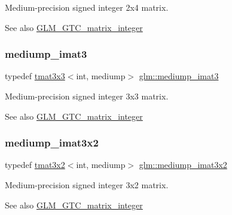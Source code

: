 Medium-\/precision signed integer 2x4 matrix. \begin{DoxySeeAlso}{See also}
\hyperlink{group__gtc__matrix__integer}{G\+L\+M\+\_\+\+G\+T\+C\+\_\+matrix\+\_\+integer} 
\end{DoxySeeAlso}
\mbox{\label{group__gtc__matrix__integer_gab033bd6a2bfebb1aa35d458c6f077ccb}} 
\subsubsection{\texorpdfstring{mediump\+\_\+imat3}{mediump\_imat3}}
{\footnotesize\ttfamily typedef \hyperlink{structglm_1_1tmat3x3}{tmat3x3}$<$int, mediump$>$ \hyperlink{group__gtc__matrix__integer_gab033bd6a2bfebb1aa35d458c6f077ccb}{glm\+::mediump\+\_\+imat3}}

Medium-\/precision signed integer 3x3 matrix. \begin{DoxySeeAlso}{See also}
\hyperlink{group__gtc__matrix__integer}{G\+L\+M\+\_\+\+G\+T\+C\+\_\+matrix\+\_\+integer} 
\end{DoxySeeAlso}
\mbox{\label{group__gtc__matrix__integer_ga8f682b5b64e2072c0729409ee6bfe2af}} 
\subsubsection{\texorpdfstring{mediump\+\_\+imat3x2}{mediump\_imat3x2}}
{\footnotesize\ttfamily typedef \hyperlink{structglm_1_1tmat3x2}{tmat3x2}$<$int, mediump$>$ \hyperlink{group__gtc__matrix__integer_ga8f682b5b64e2072c0729409ee6bfe2af}{glm\+::mediump\+\_\+imat3x2}}

Medium-\/precision signed integer 3x2 matrix. \begin{DoxySeeAlso}{See also}
\hyperlink{group__gtc__matrix__integer}{G\+L\+M\+\_\+\+G\+T\+C\+\_\+matrix\+\_\+integer} 
\end{DoxySeeAlso}
\mbox{\label{group__gtc__matrix__integer_gab4c647321a342c58119144ad08c6c406}} 
